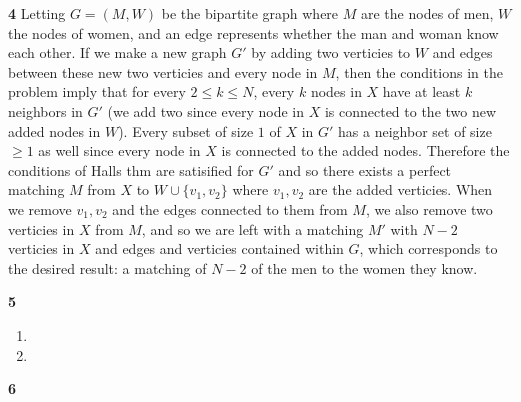 \documentclass[12pt]{article}
\newenvironment{ques}{\vspace{2 ex}}{\vspace{2 ex}}
\theoremstyle{definition}
\begin{document}
\begin{ques}
	\textbf{4}
	Letting $G = (M,W)$ be the bipartite graph where $M$ are the nodes of
	men, $W$ the nodes of women, and an edge represents whether the man and
	woman know each other. If we make a new graph $G'$ by adding two
	verticies to $W$ and edges between these new two verticies and every node
	in $M$, then the conditions in the problem imply that for every $2 \leq
	k \leq N$, every $k$ nodes in $X$ have at least $k$ neighbors in $G'$
	(we add two since every node in $X$ is connected to the two new added
	nodes in $W$). Every subset of size $1$ of $X$ in $G'$ has a neighbor
	set of size $\geq 1$ as well since every node in $X$ is connected to
	the added nodes. Therefore the conditions of Halls thm are satisified
	for $G'$ and so there exists a perfect matching $M$ from $X$ to $W \cup
	\{v_1, v_2\}$ where $v_1, v_2$ are the added verticies. When we remove
	$v_1, v_2$ and the edges connected to them from $M$, we also remove two
	verticies in $X$ from $M$, and so we are left with a matching $M'$ with
	$N-2$ verticies in $X$ and edges and verticies contained within $G$,
	which corresponds to the desired result: a matching of $N-2$ of the men
	to the women they know.
\end{ques}

\begin{ques}
	\textbf{5}
	\begin{enumerate}
		\item


		\item

	\end{enumerate}
\end{ques}

\begin{ques}
	\textbf{6}
\end{ques}
\end{document}
